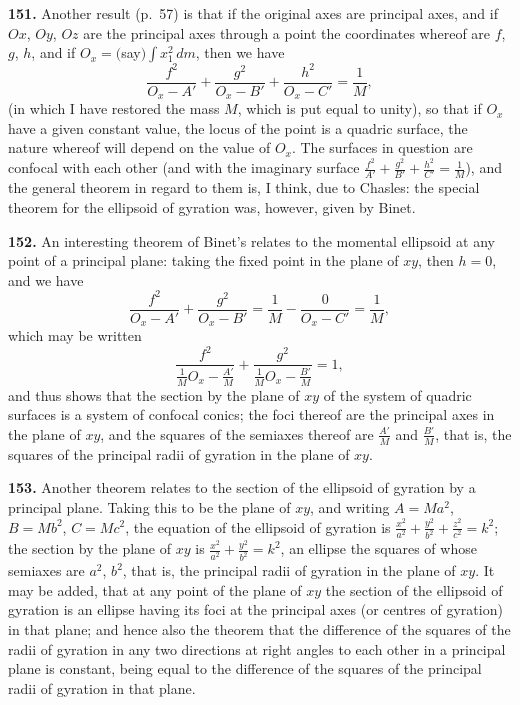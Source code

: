 \documentclass[11pt,a4paper]{book}
\begin{document}
\textbf{151.} Another result (p.~57) is that if the original axes are principal axes, and if $Ox$, $Oy$, $Oz$ are the principal axes through a point the coordinates whereof are $f$, $g$, $h$, and if $O_x = ($say$)\int x_1^2\,dm$, then we have
\[
\frac{f^2}{O_x - A'} + \frac{g^2}{O_x - B'} + \frac{h^2}{O_x - C'} = \frac{1}{M},
\]
(in which I have restored the mass $M$, which is put equal to unity), so that if $O_x$ have a given constant value, the locus of the point is a quadric surface, the nature whereof will depend on the value of $O_x$. The surfaces in question are confocal with each other (and with the imaginary surface $\frac{f^2}{A'} + \frac{g^2}{B'} + \frac{h^2}{C'} = \frac{1}{M}$), and the general theorem in regard to them is, I think, due to Chasles: the special theorem for the ellipsoid of gyration was, however, given by Binet.

\textbf{152.} An interesting theorem of Binet's relates to the momental ellipsoid at any point of a principal plane: taking the fixed point in the plane of $xy$, then $h = 0$, and we have
\[
\frac{f^2}{O_x - A'} + \frac{g^2}{O_x - B'} = \frac{1}{M} - \frac{0}{O_x - C'} = \frac{1}{M},
\]
which may be written
\[
\frac{f^2}{\frac{1}{M}O_x - \frac{A'}{M}} + \frac{g^2}{\frac{1}{M}O_x - \frac{B'}{M}} = 1,
\]
and thus shows that the section by the plane of $xy$ of the system of quadric surfaces is a system of confocal conics; the foci thereof are the principal axes in the plane of $xy$, and the squares of the semiaxes thereof are $\frac{A'}{M}$ and $\frac{B'}{M}$, that is, the squares of the principal radii of gyration in the plane of $xy$.

\textbf{153.} Another theorem relates to the section of the ellipsoid of gyration by a principal plane. Taking this to be the plane of $xy$, and writing $A = Ma^2$, $B = Mb^2$, $C = Mc^2$, the equation of the ellipsoid of gyration is $\frac{x^2}{a^2} + \frac{y^2}{b^2} + \frac{z^2}{c^2} = k^2$; the section by the plane of $xy$ is $\frac{x^2}{a^2} + \frac{y^2}{b^2} = k^2$, an ellipse the squares of whose semiaxes are $a^2$, $b^2$, that is, the principal radii of gyration in the plane of $xy$. It may be added, that at any point of the plane of $xy$ the section of the ellipsoid of gyration is an ellipse having its foci at the principal axes (or centres of gyration) in that plane; and hence also the theorem that the difference of the squares of the radii of gyration in any two directions at right angles to each other in a principal plane is constant, being equal to the difference of the squares of the principal radii of gyration in that plane.
\end{document}
